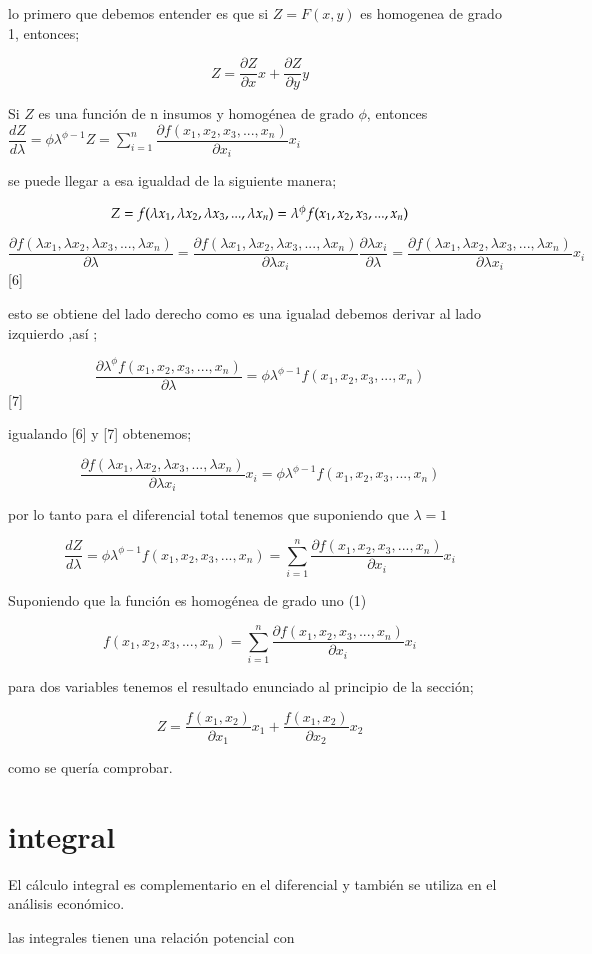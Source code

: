 \documentclass[12pt]{article}
\begin{document}
lo primero que debemos entender es que si $Z=F(x,y)$ es homogenea de grado 1, entonces;


$$Z=\dfrac{\partial Z}{\partial x}x + \dfrac{\partial Z}{\partial y}y$$



\begin{theorem}

Si $Z$ es una función de n insumos y homogénea de grado $\phi$, entonces $\dfrac{dZ}{d \lambda}=\phi \lambda ^{\phi -1}Z = \sum_{i=1}^{n} \dfrac{\partial f(x_1,x_2,x_3,...,x_n)}{\partial x_{i}}x_{i}$


\end{theorem}

se puede llegar a esa igualdad de la siguiente manera;

$$Z=f(\lambda x_1,\lambda x_2,\lambda x_3,...,\lambda x_n)\\ =
\lambda^{\phi}f(x_1,x_2,x_3,...,x_n) $$


$$\dfrac{\partial f(\lambda x_1,\lambda x_2,\lambda x_3,...,\lambda x_n)}{\partial \lambda}=\dfrac{\partial f(\lambda x_1,\lambda x_2,\lambda x_3,...,\lambda x_n)}{\partial \lambda x_{i}} \dfrac{\partial \lambda x_{i}}{\partial \lambda}=\dfrac{\partial f(\lambda x_1,\lambda x_2,\lambda x_3,...,\lambda x_n)}{\partial \lambda x_{i}} x_{i} $$ [6]

esto se obtiene  del lado derecho como es una igualad debemos derivar al lado izquierdo ,así ;

$$ \dfrac{ \partial \lambda^{\phi}f(x_1,x_2,x_3,...,x_n)}{\partial \lambda} = \phi \lambda ^{\phi -1 }f(x_1,x_2,x_3,...,x_n)$$ [7]

igualando [6] y [7] obtenemos;


$$ \dfrac{\partial f(\lambda x_1,\lambda x_2,\lambda x_3,...,\lambda x_n)}{\partial \lambda x_{i}} x_{i} = \phi \lambda ^{\phi -1 }f(x_1,x_2,x_3,...,x_n)$$

por lo tanto para el diferencial total tenemos que suponiendo que $\lambda=1$

$$\dfrac{dZ}{d \lambda}= \phi \lambda ^{\phi -1 }f(x_1,x_2,x_3,...,x_n)= \sum_{i=1}^{n}  \dfrac{\partial f(x_1,x_2,x_3,...,x_n)}{\partial x_{i}}x_{i}   $$

Suponiendo que la función es homogénea de grado uno (1) 


$$f(x_1,x_2,x_3,...,x_n)= \sum_{i=1}^{n}  \dfrac{\partial f(x_1,x_2,x_3,...,x_n)}{\partial x_{i}}x_{i}   $$


para dos variables tenemos el resultado enunciado al principio de la sección; 

$$Z = \dfrac{f(x_{1},x_{2})}{\partial x_{1}}x_{1} + \dfrac{f(x_{1},x_{2})}{\partial x_{2}}x_{2}$$

como se quería comprobar.



\section{integral}

El cálculo integral es complementario en el diferencial y también se utiliza en el análisis económico.


las integrales tienen una relación potencial con 
\end{document}
